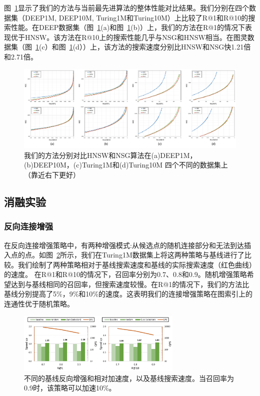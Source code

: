 图~\ref{fig:exper-total}显示了我们的方法与当前最先进算法的整体性能对比结果。我们分别在四个数据集（DEEP1M, DEEP10M, Turing1M和Turing10M）上比较了R@1和R@10的搜索性能。在DEEP数据集（图~\ref{fig:exper-total}(a)和图~\ref{fig:exper-total}(b)）上，我们的方法在R@1的情况下表现优于HNSW。该方法在R@10上的搜索性能几乎与NSG和HNSW相当。在图灵数据集（图~\ref{fig:exper-total}(c）和图~\ref{fig:exper-total}(d））上，该方法的搜索速度分别比HNSW和NSG快1.21倍和2.71倍。

\begin{figure}[htbp]
  \centering
  \includegraphics[width=\textwidth]{figures/context-1/exper-total.pdf}
  \caption{我们的方法分别对比HNSW和NSG算法在(a)DEEP1M，(b)DEEP10M，(c)Turing1M和(d)Turing10M 四个不同的数据集上（靠近右下更好）}
  \label{fig:exper-total}
\end{figure}

\subsection{消融实验}
\subsubsection{反向连接增强}
在反向连接增强策略中，有两种增强模式:从候选点的随机连接部分和无法到达插入点的点。如图~\ref{fig:exper-c1}所示，我们在Turing1M数据集上将这两种策略与基线进行了比较。我们绘制了两种策略相对于基线搜索速度和基线的实际搜索速度（红色曲线）的速度。
在R@1和R@10的情况下，召回率分别为0.7、0.8和0.9。随机增强策略希望达到与基线相同的召回率，但搜索速度较慢。在R@1的情况下，我们的方法比基线分别提高了5\%，9\%和10\%的速度。这表明我们的连接增强策略在图索引上的连通性优于随机策略。
\begin{figure}[htbp]
  \centering
  \includegraphics[width=0.7\textwidth]{figures/context-1/exper-c1.pdf}
  \caption{不同的基线反向增强和相对加速度，以及基线搜索速度。当召回率为0.9时，该策略可以加速10\%。}
  \label{fig:exper-c1}
\end{figure}


